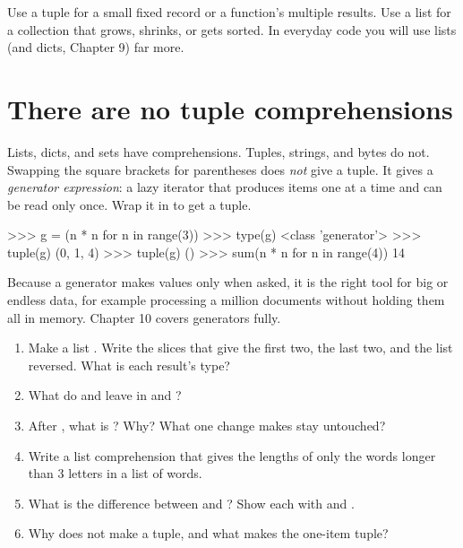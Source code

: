 \begin{gamerule}
Use a tuple for a small fixed record or a function's multiple results. Use a list for a collection that
grows, shrinks, or gets sorted. In everyday code you will use lists (and dicts, Chapter 9) far more.
\end{gamerule}

\section{There are no tuple comprehensions}

Lists, dicts, and sets have comprehensions. Tuples, strings, and bytes do not. Swapping the square brackets
for parentheses does \emph{not} give a tuple. It gives a \emph{generator expression}: a lazy iterator that
produces items one at a time and can be read only once. Wrap it in  to get a tuple.

\begin{pycode}
>>> g = (n * n for n in range(3))
>>> type(g)
<class 'generator'>
>>> tuple(g)
(0, 1, 4)
>>> tuple(g)
()
>>> sum(n * n for n in range(4))
14
\end{pycode}

Because a generator makes values only when asked, it is the right tool for big or endless data, for example
processing a million documents without holding them all in memory. Chapter 10 covers generators fully.

\begin{practice}
\begin{enumerate}
\item Make a list . Write the slices that give the first two, the last
two, and the list reversed. What is each result's type?
\item What do  and  leave in  and ?
\item After , what is ? Why? What one change makes
 stay untouched?
\item Write a list comprehension that gives the lengths of only the words longer than 3 letters in a list of
words.
\item What is the difference between  and ? Show each with \code{[1, 2]} and
\code{[3, 4]}.
\item Why does  not make a tuple, and what makes the one-item tuple?
\end{enumerate}
\end{practice}

